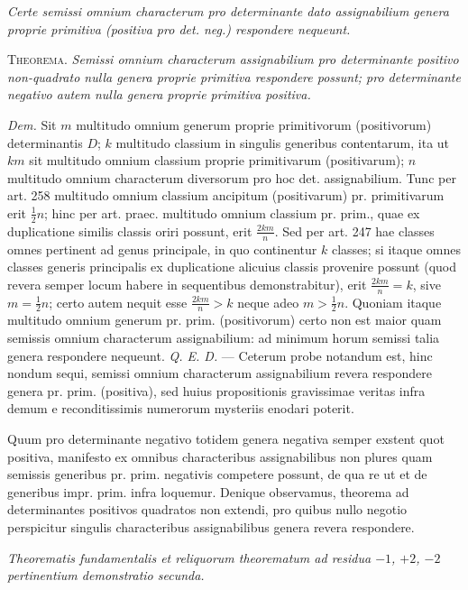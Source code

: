 \begin{center}
\textit{Certe semissi omnium characterum pro determinante dato assignabilium genera proprie primitiva
(positiva pro det. neg.) respondere nequeunt.}
\end{center}

\textsc{Theorema.} \textit{Semissi omnium characterum assignabilium pro determinante positivo
non-quadrato nulla genera proprie primitiva respondere possunt; pro determinante
negativo autem nulla genera proprie primitiva positiva.}

\textit{Dem.} Sit $m$ multitudo omnium generum proprie primitivorum (positivorum)
determinantis $D$; $k$ multitudo classium in singulis generibus contentarum,
ita ut $km$ sit multitudo omnium classium proprie primitivarum (positivarum);
$n$ multitudo omnium characterum diversorum pro hoc det. assignabilium. Tunc
per art. 258 multitudo omnium classium ancipitum (positivarum) pr. primitivarum
erit $\frac12 n$; hinc per art. praec. multitudo omnium classium pr. prim., quae ex duplicatione
similis classis oriri possunt, erit $\frac{2km}{n}$. Sed per art. 247 hae classes omnes
pertinent ad genus principale, in quo continentur $k$ classes; si itaque omnes
classes generis principalis ex duplicatione alicuius classis provenire possunt (quod
revera semper locum habere in sequentibus demonstrabitur), erit $\frac{2km}{n}=k$, sive
$m=\frac12 n$; certo autem nequit esse $\frac{2km}{n}>k$ neque adeo $m>\frac12 n$. Quoniam itaque
multitudo omnium generum pr. prim. (positivorum) certo non est maior quam
semissis omnium characterum assignabilium: ad minimum horum semissi talia
genera respondere nequeunt. \textit{Q. E. D.} --- Ceterum probe notandum est, hinc
nondum sequi, semissi omnium characterum assignabilium revera respondere genera
pr. prim. (positiva), sed huius propositionis gravissimae veritas infra demum
e reconditissimis numerorum mysteriis enodari poterit.

Quum pro determinante negativo totidem genera negativa semper exstent
quot positiva, manifesto ex omnibus characteribus assignabilibus non plures quam
semissis generibus pr. prim. negativis competere possunt, de qua re ut et de generibus
impr. prim. infra loquemur. Denique observamus, theorema ad determinantes
positivos quadratos non extendi, pro quibus nullo negotio perspicitur
singulis characteribus assignabilibus genera revera respondere.

\begin{center}
\textit{Theorematis fundamentalis et reliquorum theorematum ad residua $-1$, $+2$, $-2$ pertinentium
demonstratio secunda.}
\end{center}


